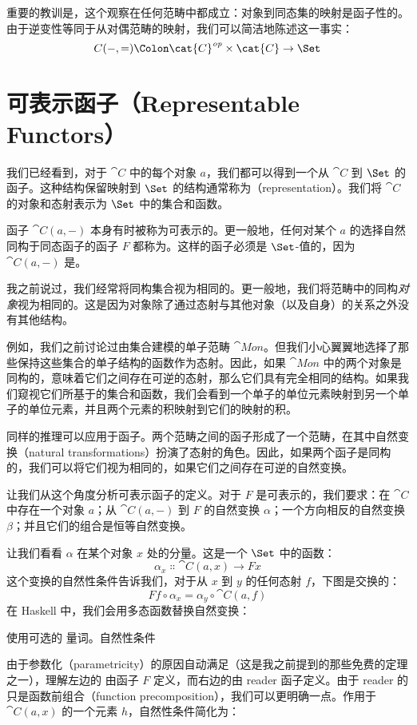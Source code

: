 重要的教训是，这个观察在任何范畴中都成立：对象到同态集的映射是函子性的。由于逆变性等同于从对偶范畴的映射，我们可以简洁地陈述这一事实：
\[C(-, =) \Colon \cat{C}^\mathit{op} \times \cat{C} \to \Set\]

\section{可表示函子（Representable Functors）}

我们已经看到，对于 $\cat{C}$ 中的每个对象 $a$，我们都可以得到一个从 $\cat{C}$ 到 $\Set$ 的函子。这种结构保留映射到 $\Set$ 的结构通常称为（representation）。我们将 $\cat{C}$ 的对象和态射表示为 $\Set$ 中的集合和函数。

函子 $\cat{C}(a, -)$ 本身有时被称为可表示的。更一般地，任何对某个 $a$ 的选择自然同构于同态函子的函子 $F$ 都称为。这样的函子必须是 $\Set$-值的，因为 $\cat{C}(a, -)$ 是。

我之前说过，我们经常将同构集合视为相同的。更一般地，我们将范畴中的同构\emph{对象}视为相同的。这是因为对象除了通过态射与其他对象（以及自身）的关系之外没有其他结构。

例如，我们之前讨论过由集合建模的单子范畴 $\cat{Mon}$。但我们小心翼翼地选择了那些保持这些集合的单子结构的函数作为态射。因此，如果 $\cat{Mon}$ 中的两个对象是同构的，意味着它们之间存在可逆的态射，那么它们具有完全相同的结构。如果我们窥视它们所基于的集合和函数，我们会看到一个单子的单位元素映射到另一个单子的单位元素，并且两个元素的积映射到它们的映射的积。

同样的推理可以应用于函子。两个范畴之间的函子形成了一个范畴，在其中自然变换（natural transformations）扮演了态射的角色。因此，如果两个函子是同构的，我们可以将它们视为相同的，如果它们之间存在可逆的自然变换。

让我们从这个角度分析可表示函子的定义。对于 $F$ 是可表示的，我们要求：在 $\cat{C}$ 中存在一个对象 $a$；从 $\cat{C}(a, -)$ 到 $F$ 的自然变换 $\alpha$；一个方向相反的自然变换 $\beta$；并且它们的组合是恒等自然变换。

让我们看看 $\alpha$ 在某个对象 $x$ 处的分量。这是一个 $\Set$ 中的函数：
\[\alpha_x \Colon \cat{C}(a, x) \to F x\]
这个变换的自然性条件告诉我们，对于从 $x$ 到 $y$ 的任何态射 $f$，下图是交换的：
\[F f \circ \alpha_x = \alpha_y \circ \cat{C}(a, f)\]
在 Haskell 中，我们会用多态函数替换自然变换：

使用可选的  量词。自然性条件

由于参数化（parametricity）的原因自动满足（这是我之前提到的那些免费的定理之一），理解左边的  由函子 $F$ 定义，而右边的由 reader 函子定义。由于 reader 的  只是函数前组合（function precomposition），我们可以更明确一点。作用于 $\cat{C}(a, x)$ 的一个元素 $h$，自然性条件简化为：

